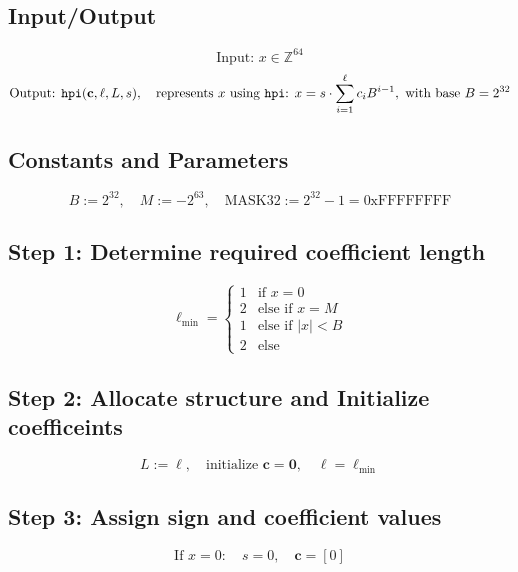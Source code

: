 \documentclass[11pt]{article}
\begin{document}
	\subsection*{Input/Output}
	\[
	\text{Input: } x \in \mathbb{Z}^{64}
	\]
	\[
	\text{Output: } \texttt{hpi}(\mathbf{c}, \ell, L, s),\quad \text{represents } x\text{ using \texttt{hpi}: } x = s \cdot \sum_{i=1}^{\ell} c_i B^{i-1},\ \text{with base } B = 2^{32}
	\]
	
	
	\subsection*{Constants and Parameters}
	\[
	B := 2^{32}, \quad M := -2^{63}, \quad \text{MASK32} := 2^{32} - 1 = \text{0xFFFFFFFF}
	\]
	
	
	\subsection*{Step 1: Determine required coefficient length}
	\[
	\ell_{\min} =
	\begin{cases}
		1 & \text{if } x = 0 \\
		2 & \text{else if } x = M \\
		1 & \text{else if } |x| < B \\
		2 & \text{else}
	\end{cases}
	\]
	
	
	\subsection*{Step 2: Allocate structure and Initialize coefficeints}
	\[
	L := \ell, \quad \text{initialize } \mathbf{c} = \mathbf{0}, \quad \ell = \ell_{\text{min}}
	\]
	
	
	\subsection*{Step 3: Assign sign and coefficient values}
	\[
	\text{If } x = 0: \quad s = 0, \quad \mathbf{c} = [0]
	\]
	
	
\end{document}
